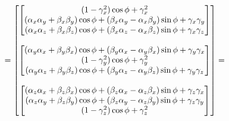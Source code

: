 \[
    =
    \begin{bmatrix}
        \begin{bmatrix}
            (1 - \gamma_x^2) \cos \phi + \gamma_x^2 \\
            (\alpha_x \alpha_y + \beta_x \beta_y) \cos \phi + (\beta_x \alpha_y - \alpha_x \beta_y) \sin \phi + \gamma_x \gamma_y \\
            (\alpha_x \alpha_z + \beta_x \beta_z) \cos \phi + (\beta_x \alpha_z - \alpha_x \beta_z) \sin \phi + \gamma_x \gamma_z \\
        \end{bmatrix} \\ \\
        \begin{bmatrix}
            (\alpha_y \alpha_x + \beta_y \beta_x) \cos \phi + (\beta_y \alpha_x - \alpha_y \beta_x) \sin \phi + \gamma_y \gamma_x \\
            (1 - \gamma_y^2) \cos \phi + \gamma_y^2 \\
            (\alpha_y \alpha_z + \beta_y \beta_z) \cos \phi + (\beta_y \alpha_z - \alpha_y \beta_z) \sin \phi + \gamma_y \gamma_z \\
        \end{bmatrix} \\ \\
        \begin{bmatrix}
            (\alpha_z \alpha_x + \beta_z \beta_x) \cos \phi + (\beta_z \alpha_x - \alpha_z \beta_x) \sin \phi + \gamma_z \gamma_x \\
            (\alpha_z \alpha_y + \beta_z \beta_y) \cos \phi + (\beta_z \alpha_y - \alpha_z \beta_y) \sin \phi + \gamma_z \gamma_y \\
            (1 - \gamma_z^2) \cos \phi + \gamma_z^2 \\
        \end{bmatrix} \\
    \end{bmatrix} =
\]
